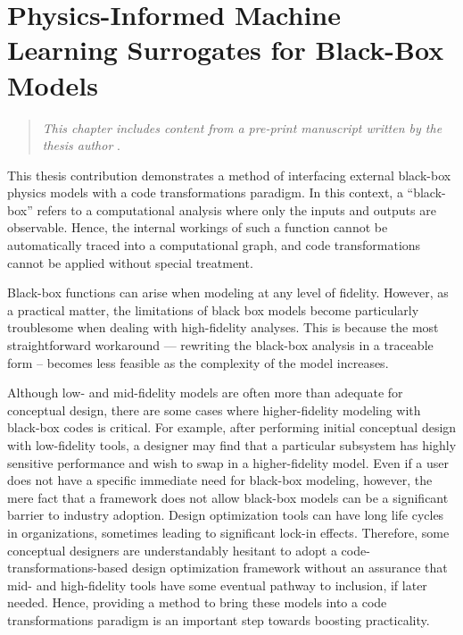 \chapter{Physics-Informed Machine Learning Surrogates for Black-Box Models}
\label{chap:physics-informed-ml}

\begin{quote}
    \emph{This chapter includes content from a pre-print manuscript written by the thesis author} \cite{neuralfoil_preprint, neuralfoil_github}.
\end{quote}

This thesis contribution demonstrates a method of interfacing external black-box physics models with a code transformations paradigm. In this context, a ``black-box'' refers to a computational analysis where only the inputs and outputs are observable. Hence, the internal workings of such a function cannot be automatically traced into a computational graph, and code transformations cannot be applied without special treatment.

Black-box functions can arise when modeling at any level of fidelity. However, as a practical matter, the limitations of black box models become particularly troublesome when dealing with high-fidelity analyses. This is because the most straightforward workaround — rewriting the black-box analysis in a traceable form -- becomes less feasible as the complexity of the model increases.

Although low- and mid-fidelity models are often more than adequate for conceptual design, there are some cases where higher-fidelity modeling with black-box codes is critical. For example, after performing initial conceptual design with low-fidelity tools, a designer may find that a particular subsystem has highly sensitive performance and wish to swap in a higher-fidelity model. Even if a user does not have a specific immediate need for black-box modeling, however, the mere fact that a framework does not allow black-box models can be a significant barrier to industry adoption. Design optimization tools can have long life cycles in organizations, sometimes leading to significant lock-in effects. Therefore, some conceptual designers are understandably hesitant to adopt a code-transformations-based design optimization framework without an assurance that mid- and high-fidelity tools have some eventual pathway to inclusion, if later needed. Hence, providing a method to bring these models into a code transformations paradigm is an important step towards boosting practicality.

